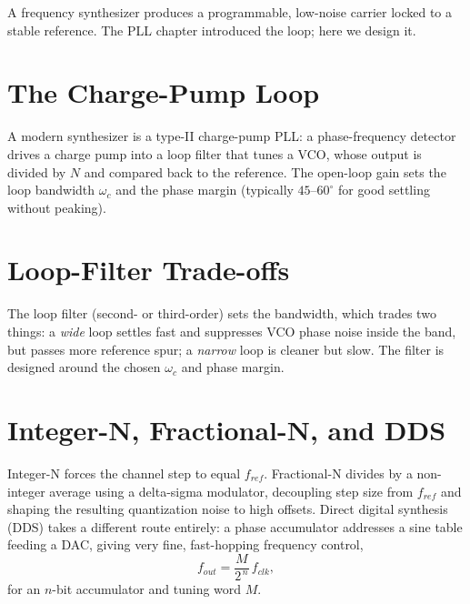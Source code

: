 A frequency synthesizer produces a programmable, low-noise carrier locked to a
stable reference. The PLL chapter introduced the loop; here we design it.

\section{The Charge-Pump Loop}
A modern synthesizer is a type-II charge-pump PLL: a phase-frequency detector
drives a charge pump into a loop filter that tunes a VCO, whose output is divided
by $N$ and compared back to the reference. The open-loop gain sets the loop
bandwidth $\omega_c$ and the phase margin (typically $45$--$60^\circ$ for good
settling without peaking).

\section{Loop-Filter Trade-offs}
The loop filter (second- or third-order) sets the bandwidth, which trades two
things: a \emph{wide} loop settles fast and suppresses VCO phase noise inside the
band, but passes more reference spur; a \emph{narrow} loop is cleaner but slow.
The filter is designed around the chosen $\omega_c$ and phase margin.

\section{Integer-N, Fractional-N, and DDS}
Integer-N forces the channel step to equal $f_{ref}$. Fractional-N divides by a
non-integer average using a delta-sigma modulator, decoupling step size from
$f_{ref}$ and shaping the resulting quantization noise to high offsets. Direct
digital synthesis (DDS) takes a different route entirely: a phase accumulator
addresses a sine table feeding a DAC, giving very fine, fast-hopping frequency
control,
\[ f_{out} = \frac{M}{2^{\,n}}\,f_{clk}, \]
for an $n$-bit accumulator and tuning word $M$.
